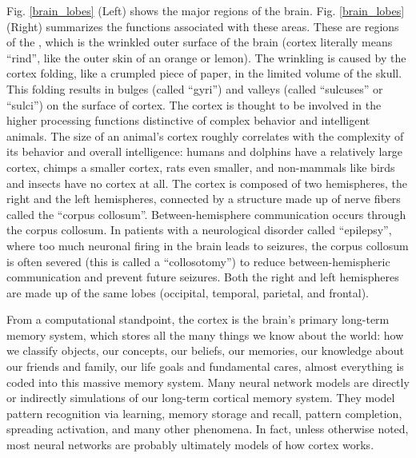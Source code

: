 Fig. \ref{brain_lobes} (Left) shows the major regions of the brain. Fig. \ref{brain_lobes} (Right) summarizes the functions associated with these areas. These are regions of the , which is the wrinkled outer surface of the brain (cortex literally means ``rind'', like the outer skin of an orange or lemon). The wrinkling is caused by the cortex folding, like a crumpled piece of paper, in the limited volume of the skull. This folding results in bulges (called ``gyri'') and valleys (called  ``sulcuses'' or ``sulci'') on the surface of cortex. The cortex is thought to be involved in the higher processing functions distinctive of complex behavior and intelligent animals. The size of an animal's cortex roughly correlates with the complexity of its behavior and overall intelligence: humans and dolphins have a relatively large cortex, chimps a smaller cortex, rats even smaller, and non-mammals like birds and insects have no cortex at all. The cortex is composed of two hemispheres, the right and the left hemispheres, connected by a structure made up of nerve fibers called the ``corpus collosum''. Between-hemisphere communication occurs through the corpus collosum. In patients with a neurological disorder called ``epilepsy'', where too much neuronal firing in the brain leads to seizures, the corpus collosum is often severed (this is called a ``collosotomy'') to reduce between-hemispheric communication and prevent future seizures. Both the right and left hemispheres are made up of the same lobes (occipital, temporal, parietal, and frontal).	

From a computational standpoint, the cortex is the brain's primary long-term memory system, which stores all the many things we know about the world: how we classify objects, our concepts, our beliefs, our memories, our knowledge about our friends and family, our life goals and fundamental cares, almost everything is coded into this massive memory system. Many neural network models are directly or indirectly simulations of our long-term cortical memory system. They model pattern recognition via learning, memory storage and recall, pattern completion, spreading activation, and many other phenomena. In fact, unless otherwise noted, most neural networks are probably ultimately models of how cortex works.

